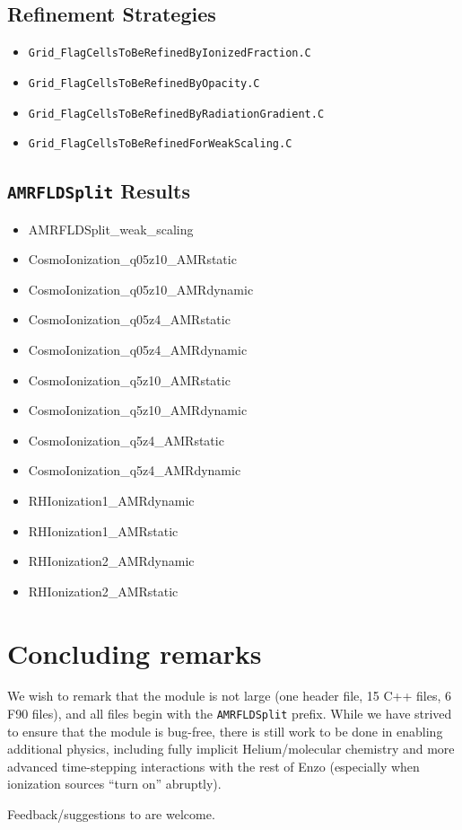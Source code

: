 \documentclass[letterpaper,10pt]{article}
\renewcommand{\(}{\left(}
\renewcommand{\)}{\right)}
\begin{document}
\subsection{Refinement Strategies}
\label{sec:AMRFLDSplit_refinement}

\begin{itemize}
\item {\tt Grid\_FlagCellsToBeRefinedByIonizedFraction.C}
\item {\tt Grid\_FlagCellsToBeRefinedByOpacity.C}
\item {\tt Grid\_FlagCellsToBeRefinedByRadiationGradient.C}
\item {\tt Grid\_FlagCellsToBeRefinedForWeakScaling.C}
\end{itemize}




\subsection{{\tt AMRFLDSplit} Results}
\label{sec:AMRFLDSplit_results}

\begin{itemize}
\item AMRFLDSplit\_weak\_scaling
\item CosmoIonization\_q05z10\_AMRstatic
\item CosmoIonization\_q05z10\_AMRdynamic
\item CosmoIonization\_q05z4\_AMRstatic
\item CosmoIonization\_q05z4\_AMRdynamic
\item CosmoIonization\_q5z10\_AMRstatic
\item CosmoIonization\_q5z10\_AMRdynamic
\item CosmoIonization\_q5z4\_AMRstatic
\item CosmoIonization\_q5z4\_AMRdynamic
\item RHIonization1\_AMRdynamic
\item RHIonization1\_AMRstatic
\item RHIonization2\_AMRdynamic
\item RHIonization2\_AMRstatic
\end{itemize}





\section{Concluding remarks}
\label{sec:conclusions}

We wish to remark that the module is not large (one header
file, 15 C++ files, 6 F90 files), and all files begin with the 
{\tt AMRFLDSplit} prefix.  While we have strived to ensure that the
module is bug-free, there is still work to be done in enabling
additional physics, including fully implicit Helium/molecular
chemistry and more advanced time-stepping interactions with the rest
of Enzo (especially when ionization sources ``turn on'' abruptly).  

Feedback/suggestions to are welcome.




\end{document}
